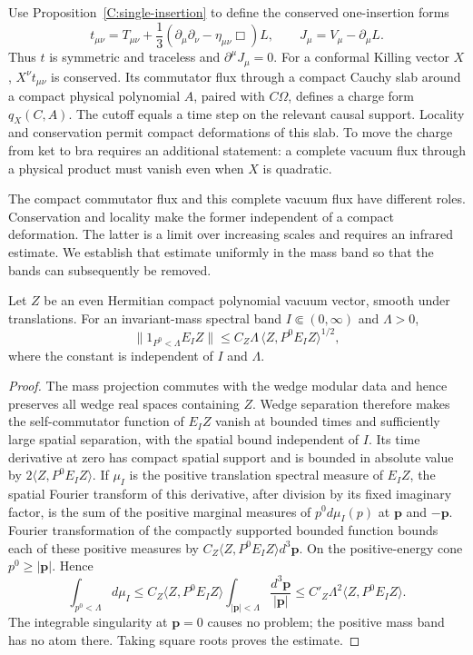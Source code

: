 Use Proposition~\ref{C:single-insertion} to define the conserved
one-insertion forms
\begin{equation}\label{C:formal-currents}
 t_{\mu\nu}=T_{\mu\nu}
 +\frac13(\partial_\mu\partial_\nu-\eta_{\mu\nu}\Box)L,
 \qquad J_\mu=V_\mu-\partial_\mu L.
\end{equation}
Thus $t$ is symmetric and traceless and $\partial^\mu J_\mu=0$.
For a conformal Killing vector $X$, $X^\nu t_{\mu\nu}$ is conserved.
Its commutator flux through a compact Cauchy slab around a compact
physical polynomial $A$, paired with $C\Omega$, defines a charge
form $q_X(C,A)$. The cutoff equals a time step on the relevant causal
support. Locality and conservation permit compact deformations of
this slab. To move the charge from ket to bra requires an additional
statement: a complete vacuum flux through a physical product must
vanish even when $X$ is quadratic.

The compact commutator flux and this complete vacuum flux have
different roles.  Conservation and locality make the former
independent of a compact deformation.  The latter is a limit over
increasing scales and requires an infrared estimate.  We establish
that estimate uniformly in the mass band so that the bands can
subsequently be removed.

\begin{lemma}\label{C:low-energy}
Let $Z$ be an even Hermitian compact polynomial vacuum vector, smooth
under translations. For an invariant-mass spectral band
$I\Subset(0,\infty)$ and $\Lambda>0$,
\begin{equation}\label{C:low-energy-bound}
 \|1_{P^0<\Lambda}E_I Z\|
 \le C_Z\Lambda\,\langle Z,P^0E_I Z\rangle^{1/2},
\end{equation}
where the constant is independent of $I$ and $\Lambda$.
\end{lemma}

\begin{proof}
The mass projection commutes with the wedge modular data and hence
preserves all wedge real spaces containing $Z$. Wedge separation
therefore makes the self-commutator function of $E_IZ$ vanish at
bounded times and sufficiently large spatial separation, with the
spatial bound independent of $I$. Its time derivative at zero has
compact spatial support and is bounded in absolute value by
$2\langle Z,P^0E_IZ\rangle$. If $\mu_I$ is the positive translation
spectral measure of $E_IZ$, the spatial Fourier transform of this
derivative, after division by its fixed imaginary factor, is the
sum of the positive marginal measures of $p^0d\mu_I(p)$ at
$\boldsymbol p$ and $-\boldsymbol p$. Fourier transformation of the
compactly supported bounded function bounds each of these positive
measures by
$C_Z\langle Z,P^0E_IZ\rangle d^3\boldsymbol p$.
On the positive-energy cone $p^0\ge|\boldsymbol p|$. Hence
\[
 \int_{p^0<\Lambda}d\mu_I
 \le C_Z\langle Z,P^0E_IZ\rangle
 \int_{|\boldsymbol p|<\Lambda}\frac{d^3\boldsymbol p}{|\boldsymbol p|}
 \le C'_Z\Lambda^2\langle Z,P^0E_IZ\rangle.
\]
The integrable singularity at $\boldsymbol p=0$ causes no problem;
the positive mass band has no atom there. Taking square roots proves
the estimate.
\end{proof}


